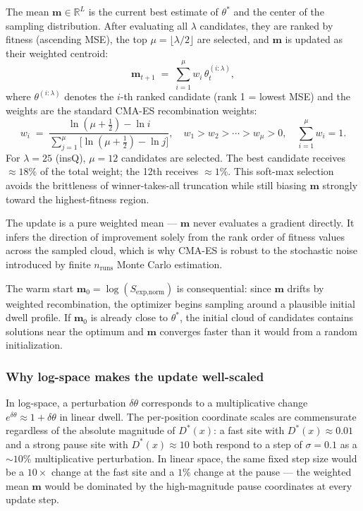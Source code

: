 \documentclass[11pt]{article}
\begin{document}
The mean $\mathbf{m} \in \mathbb{R}^L$ is the current best estimate of
$\theta^*$ and the center of the sampling distribution. After evaluating all
$\lambda$ candidates, they are ranked by fitness (ascending MSE), the top
$\mu = \lfloor\lambda/2\rfloor$ are selected, and $\mathbf{m}$ is updated as
their weighted centroid:
\begin{equation}
  \mathbf{m}_{t+1} \;=\; \sum_{i=1}^{\mu} w_i\, \theta^{(i:\lambda)}_t,
\end{equation}
where $\theta^{(i:\lambda)}$ denotes the $i$-th ranked candidate (rank 1 =
lowest MSE) and the weights are the standard CMA-ES recombination weights:
\begin{equation}
  w_i \;=\; \frac{\ln(\mu + \tfrac{1}{2}) - \ln i}
                 {\displaystyle\sum_{j=1}^{\mu}\bigl[\ln(\mu+\tfrac{1}{2}) - \ln j\bigr]},
  \quad w_1 > w_2 > \cdots > w_\mu > 0, \quad \sum_{i=1}^{\mu} w_i = 1.
\end{equation}
For $\lambda = 25$ (insQ), $\mu = 12$ candidates are selected. The best
candidate receives $\approx 18\%$ of the total weight; the 12th receives
$\approx 1\%$. This soft-max selection avoids the brittleness of winner-takes-all
truncation while still biasing $\mathbf{m}$ strongly toward the highest-fitness
region.

The update is a pure weighted mean — $\mathbf{m}$ never evaluates a gradient
directly. It infers the direction of improvement solely from the rank order of
fitness values across the sampled cloud, which is why CMA-ES is robust to the
stochastic noise introduced by finite $n_{\text{runs}}$ Monte Carlo estimation.

The warm start $\mathbf{m}_0 = \log(S_{\text{exp,norm}})$ is consequential:
since $\mathbf{m}$ drifts by weighted recombination, the optimizer begins
sampling around a plausible initial dwell profile. If $\mathbf{m}_0$ is already
close to $\theta^*$, the initial cloud of candidates contains solutions near
the optimum and $\mathbf{m}$ converges faster than it would from a random
initialization.

\subsubsection*{Why log-space makes the update well-scaled}

In log-space, a perturbation $\delta\theta$ corresponds to a multiplicative
change $e^{\delta\theta} \approx 1 + \delta\theta$ in linear dwell. The
per-position coordinate scales are commensurate regardless of the absolute
magnitude of $D^*(x)$: a fast site with $D^*(x) \approx 0.01$ and a strong
pause site with $D^*(x) \approx 10$ both respond to a step of $\sigma = 0.1$
as a $\sim 10\%$ multiplicative perturbation. In linear space, the same fixed
step size would be a $10\times$ change at the fast site and a $1\%$ change at
the pause — the weighted mean $\mathbf{m}$ would be dominated by the
high-magnitude pause coordinates at every update step.
\end{document}
